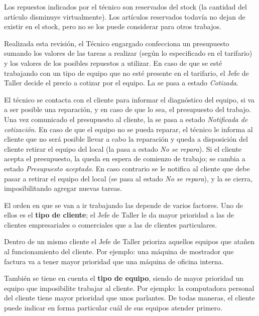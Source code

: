 \documentclass[12pt]{extarticle}
\begin{document}
\begin{spacing}{1.2}
    Los repuestos indicados por el técnico son reservados del stock (la cantidad del artículo disminuye virtualmente). Los artículos reservados todavía no dejan de existir en el stock, pero no se los puede considerar para otros trabajos.     
    
    Realizada esta revisión, el Técnico engargado confecciona un presupuesto sumando los valores de las tareas a realizar (según lo especificado en el tarifario) y los valores de los posibles repuestos a utilizar. En caso de que se esté trabajando con un tipo de equipo que no esté presente en el tarifario, el Jefe de Taller decide el precio a cotizar por el equipo. La \OT{} se pasa a estado \textit{Cotizada}.
    
    El técnico se contacta con el cliente para informar el diagnóstico del equipo, si va a ser posible una reparación, y en caso de que lo sea, el presupuesto del trabajo. Una vez comunicado el presupuesto al cliente, la \OT{} se pasa a estado \textit{Notificada de cotización}. En caso de que el equipo no se pueda reparar, el técnico le informa al cliente que no será posible llevar a cabo la reparación y queda a disposición del cliente retirar el equipo del local (la \OT{} pasa a estado \textit{No se repara}).
    Si el cliente acepta el presupuesto, la \OT{} queda en espera de comienzo de trabajo; se cambia a estado \textit{Presupuesto aceptado}. En caso contrario se le notifica al cliente que debe pasar a retirar el equipo del local (se pasa al estado \textit{No se repara}), y la \OT{} se cierra, imposibilitando agregar nuevas tareas.

    El orden en que se van a ir trabajando las \OTs{} depende de varios factores. Uno de ellos es el \textbf{tipo de cliente}; el Jefe de Taller le da mayor prioridad a las \OTs{} de clientes empresariales o comerciales que a las de clientes particulares.

    Dentro de un mismo cliente el Jefe de Taller prioriza aquellos equipos que atañen al funcionamiento del cliente. Por ejemplo: una máquina de mostrador que factura va a tener mayor prioridad que una máquina de oficina interna.

    También se tiene en cuenta el \textbf{tipo de equipo}, siendo de mayor prioridad un equipo que imposibilite trabajar al cliente. Por ejemplo: la computadora personal del cliente tiene mayor prioridad que unos parlantes.
    De todas maneras, el cliente puede indicar en forma particular cuál de sus equipos atender primero.


\end{spacing}
\end{document}
